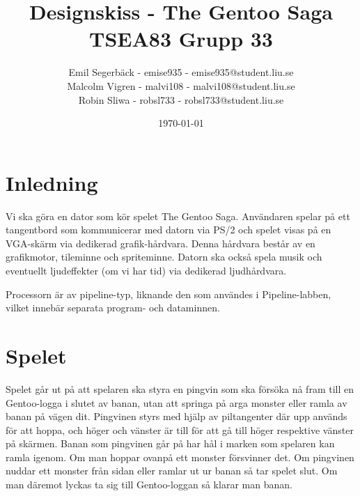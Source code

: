 \documentclass[a4paper,titlepage]{article}
\title{
\textbf{Designskiss - The Gentoo Saga} \\
\large TSEA83 Grupp 33}
\date{\today}
\author{
        Emil Segerbäck - emise935 - emise935@student.liu.se\\
		Malcolm Vigren - malvi108 - malvi108@student.liu.se \\
		Robin Sliwa - robsl733 - robsl733@student.liu.se}
\begin{document}
    \maketitle
    \newpage
\tableofcontents
    \newpage

\section{Inledning}
Vi ska göra en dator som kör spelet The Gentoo Saga. Användaren spelar på ett
tangentbord som kommunicerar med datorn via PS/2 och spelet visas på en
VGA-skärm via dedikerad grafik-hårdvara. Denna hårdvara består av en
grafikmotor, tileminne och spriteminne. Datorn ska också spela musik och
eventuellt ljudeffekter (om vi har tid) via dedikerad ljudhårdvara.

Processorn är av pipeline-typ, liknande den som användes i
Pipeline-labben, vilket innebär separata program- och dataminnen. 

\section{Spelet}
Spelet går ut på att spelaren ska styra en pingvin som ska försöka nå fram till
en Gentoo-logga i slutet av banan, utan att springa på arga monster eller ramla
av banan på vägen dit. Pingvinen styrs med hjälp av piltangenter där upp används
för att hoppa, och höger och vänster är till för att gå till höger respektive
vänster på skärmen. Banan som pingvinen går på har hål i marken som spelaren kan
ramla igenom. Om man hoppar ovanpå ett monster försvinner det. Om pingvinen
nuddar ett monster från sidan eller ramlar ut ur banan så tar spelet slut. Om
man däremot lyckas ta sig till Gentoo-loggan så klarar man banan.
\end{document}
